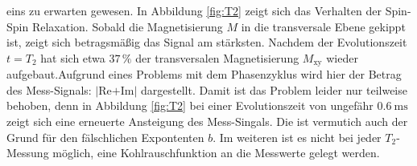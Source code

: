 eins zu erwarten gewesen. In Abbildung \ref{fig:T2} zeigt sich das Verhalten der
Spin-Spin Relaxation. Sobald die Magnetisierung $M$ in die transversale Ebene gekippt
ist, zeigt sich betragsmäßig das Signal am stärksten. Nachdem der Evolutionszeit
$t=T_2$ hat sich etwa $37\,\%$ der transversalen Magnetisierung $M_{\text{xy}}$
wieder aufgebaut.Aufgrund eines Problems mit dem Phasenzyklus wird hier der
Betrag des Mess-Signals: $|$Re$+$Im$|$ dargestellt. Damit ist das Problem leider
nur teilweise behoben, denn in Abbildung \ref{fig:T2} bei einer Evolutionszeit
von ungefähr $\SI{0,6}{\milli\second}$ zeigt sich eine erneuerte Ansteigung des
Mess-Singals. Die ist vermutich auch der Grund für den fälschlichen Expontenten $b$.
Im weiteren ist es nicht bei jeder $T_2$-Messung möglich, eine Kohlrauschfunktion
an die Messwerte gelegt werden.\\
